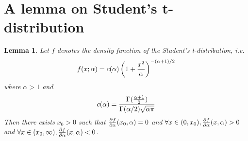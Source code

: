 \documentclass[11pt,a4]{amsart}
\newcommand{\pd}{\partial}
\newtheorem{lemma}{Lemma}[section]
\newcommand{\1}{{\mathbf 1}}
\begin{document}
\section{A lemma on Student's t-distribution}
\setcounter{equation}{0}
\begin{lemma}
  \label{lemma:II}
  Let $f$ denotes the density function of the Student's
  t-distribution, i.e.
  \[
  f(x; \alpha) = c(\alpha) \left(
    1 + {x^2 \over \alpha}
  \right)^{-(\alpha + 1)/2}
  \]
  where $\alpha > 1$ and
  \[
  c(\alpha) = {
    \Gamma({\alpha + 1 \over 2})
    \over
    \Gamma(\alpha/2) \sqrt{\alpha \pi}
  }
  \]
  Then there exists $x_0 > 0$ such that ${\pd f \over
    \pd \alpha}(x_0, \alpha) = 0$ and $\forall x \in (0, x_0), {\pd f \over
    \pd \alpha}(x, \alpha) > 0$ and $\forall x \in (x_0, \infty), {\pd f
    \over \pd \alpha}(x, \alpha) < 0$.
\end{lemma}
\end{document}
